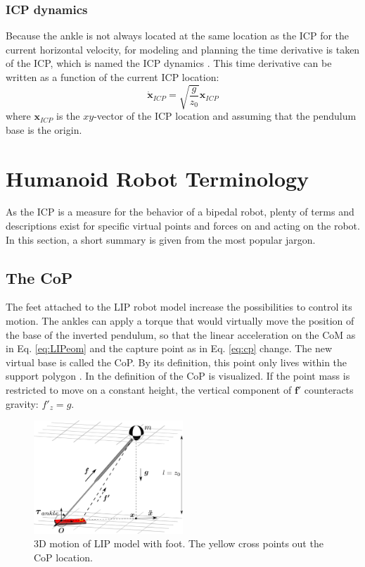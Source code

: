 \subsubsection{\ac{ICP} dynamics}
Because the ankle is not always located at the same location as the \ac{ICP} for the current horizontal velocity, for modeling and planning the time derivative is taken of the \ac{ICP}, which is named the \ac{ICP} dynamics \cite{koolen2012capturability}. This time derivative can be written as a function of the current \ac{ICP} location:
\begin{equation}
\boldsymbol{\dot{x}}_{ICP}=\sqrt{ \frac{g}{z_0}}\boldsymbol{x}_{ICP} 
\label{eq:cp}
\end{equation}
where $\boldsymbol{x}_{ICP}$ is the $xy$-vector of the \ac{ICP} location and assuming that the pendulum base is the origin.

\section{Humanoid Robot Terminology}
As the \ac{ICP} is a measure for the behavior of a bipedal robot, plenty of terms and descriptions exist for specific virtual points and forces on and acting on the robot. In this section, a short summary is given from the most popular jargon.

\subsection{The \ac{CoP}}
The feet attached to the \ac{LIP} robot model increase the possibilities to control its motion. The ankles can apply a torque that would virtually move the position of the base of the inverted pendulum, so that the linear acceleration on the \ac{CoM} as in Eq. \eqref{eq:LIPeom} and the capture point as in Eq. \eqref{eq:cp} change. The new virtual base is called the \ac{CoP}. By its definition, this point only lives within the support polygon \cite{vukobratovic2004zero}. In  the definition of the \ac{CoP} is visualized. If the point mass is restricted to move on a constant height, the vertical component of $\boldsymbol{f'}$ counteracts gravity: $f'_z=g$. 
\begin{figure}[h]
\centering
\includegraphics[width=0.5\textwidth]{STYLESTUFF/3DCoMwithfoot.png}
\caption{\ac{3D} motion of \ac{LIP} model with foot. The yellow cross points out the \ac{CoP} location.}
\label{fig:3dlipfoot}
\end{figure}
